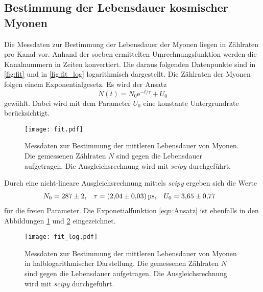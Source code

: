 \subsection{Bestimmung der Lebensdauer kosmischer Myonen}
Die Messdaten zur Bestimmung der Lebensdauer der Myonen liegen in Zählraten pro Kanal vor. Anhand der soeben ermittelten Umrechnungsfunktion werden die Kanalnummern 
in Zeiten konvertiert. Die daraus folgenden Datenpunkte sind in \autoref{fig:fit} und in \autoref{fig:fit_log} logarithmisch dargestellt.
Die Zählraten der Myonen folgen einem Exponentialgesetz.
Es wird der Ansatz
\begin{equation}
  \label{eqn:Ansatz}
  N(t) = N_0 \mathrm{e}^{-t/\tau} + U_0
\end{equation}
gewählt. Dabei wird mit dem Parameter $U_0$ eine konstante Untergrundrate berücksichtigt.
\begin{figure}
  \centering
  \texttt{[image: fit.pdf]}
  \caption{Messdaten zur Bestimmung der mittleren Lebensdauer von Myonen. Die gemessenen Zählraten $N$ sind gegen die Lebensdauer aufgetragen. 
  Die Ausgleichsrechnung wird mit \textit{scipy} \cite{scipy} durchgeführt.}
  \label{fig:fit}
\end{figure}
Durch eine nicht-lineare Ausgleichsrechnung mittels \textit{scipy} \cite{scipy} ergeben sich die Werte
\begin{align*}
  N_0 &= \num{287 +- 2}, & \tau &= \qty{2.04 +- 0.03}{\micro\second}, & U_0 &= \num{3.65 +- 0.77}
\end{align*}
für die freien Parameter. Die Exponetialfunktion \ref{eqn:Ansatz} ist ebenfalls in den Abbildungen \ref{fig:fit} und \ref{fig:fit_log} eingezeichnet.
\begin{figure}
  \centering
  \texttt{[image: fit\_log.pdf]}
  \caption{Messdaten zur Bestimmung der mittleren Lebensdauer von Myonen in halblogarithmischer Darstellung. Die gemessenen Zählraten $N$ sind gegen die Lebensdauer aufgetragen. 
  Die Ausgleichsrechnung wird mit \textit{scipy} \cite{scipy} durchgeführt.}
  \label{fig:fit_log}
\end{figure}
